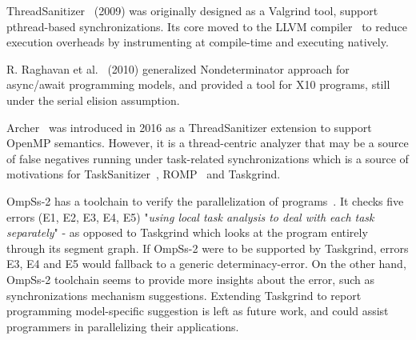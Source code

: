 ThreadSanitizer~\cite{thread-sanitizer-valgrind} (2009) was originally designed as a Valgrind tool, support pthread-based synchronizations.
Its core moved to the LLVM compiler~\cite{tsan-llvm} to reduce execution overheads by instrumenting at compile-time and executing natively.

R. Raghavan et al.~\cite{x10-determinacy-race} (2010) generalized Nondeterminator approach for async/await programming models, and provided a tool for X10 programs, still under the serial elision assumption.

Archer~\cite{archer} was introduced in 2016 as a ThreadSanitizer extension to support OpenMP semantics.
However, it is a thread-centric analyzer that may be a source of false negatives running under task-related synchronizations which is a source of motivations for TaskSanitizer~\cite{Matar18}, ROMP~\cite{ROMP} and Taskgrind.

OmpSs-2 has a toolchain to verify the parallelization of programs~\cite{ompss2-correctness}.
It checks five errors (E1, E2, E3, E4, E5) "\emph{using local task analysis to deal with each task separately}" - as opposed to Taskgrind which looks at the program entirely through its segment graph.
If OmpSs-2 were to be supported by Taskgrind, errors E3, E4 and E5 would fallback to a generic determinacy-error.
On the other hand, OmpSs-2 toolchain seems to provide more insights about the error, such as synchronizations mechanism suggestions.
Extending Taskgrind to report programming model-specific suggestion is left as future work, and could assist programmers in parallelizing their applications.

	   
